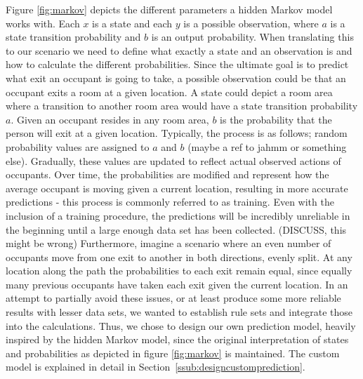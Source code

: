 Figure \ref{fig:markov} depicts the different parameters a hidden Markov model works with. Each \(x\) is a state and each \(y\) is a possible observation, where \(a\) is a state transition probability and \(b\) is an output probability. When translating this to our scenario we need to define what exactly a state and an observation is and how to calculate the different probabilities. Since the ultimate goal is to predict what exit an occupant is going to take, a possible observation could be that an occupant exits a room at a given location. A state could depict a room area where a transition to another room area would have a state transition probability \(a\). Given an occupant resides in any room area, \(b\) is the probability that the person will exit at a given location. Typically, the process is as follows; random probability values are assigned to \(a\) and \(b\) (maybe a ref to jahmm or something else). Gradually, these values are updated to reflect actual observed actions of occupants. Over time, the probabilities are modified and represent how the average occupant is moving given a current location, resulting in more accurate predictions - this process is commonly referred to as training. Even with the inclusion of a training procedure, the predictions will be incredibly unreliable in the beginning until a large enough data set has been collected. (DISCUSS, this might be wrong) Furthermore, imagine a scenario where an even number of occupants move from one exit to another in both directions, evenly split. At any location along the path the probabilities to each exit remain equal, since equally many previous occupants have taken each exit given the current location. In an attempt to partially avoid these issues, or at least produce some more reliable results with lesser data sets, we wanted to establish rule sets and integrate those into the calculations. Thus, we chose to design our own prediction model, heavily inspired by the hidden Markov model, since the original interpretation of states and probabilities as depicted in figure \ref{fig:markov} is maintained. The custom model is explained in detail in Section~\ref{ssub:designcustomprediction}. 

